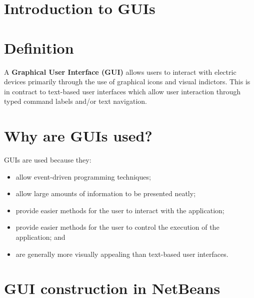 \documentclass[a4paper]{systems-software}
\begin{document}
\section{Introduction to GUIs}

\section*{Definition}

A \textbf{Graphical User Interface (GUI)} allows users to interact with electric devices primarily through the use of graphical icons and visual indictors. This is in contract to text-based user interfaces which allow user interaction through typed command labels and/or text navigation.


\section*{Why are GUIs used?}

GUIs are used because they:
\begin{itemize}
	\item allow event-driven programming techniques;
	\item allow large amounts of information to be presented neatly;
	\item provide easier methods for the user to interact with the application;
	\item provide easier methods for the user to control the execution of the application; and
	\item are generally more visually appealing than text-based user interfaces.
\end{itemize}


\newpage

\section{GUI construction in NetBeans}
\end{document}
